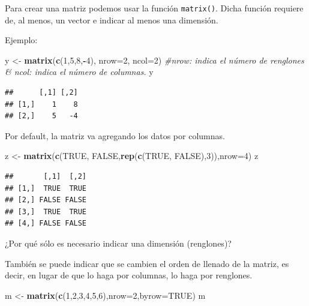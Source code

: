 \documentclass[
]{book}
\newenvironment{Shaded}{\begin{snugshade}}{\end{snugshade}}
\newcommand{\AttributeTok}[1]{\textcolor[rgb]{0.13,0.29,0.53}{#1}}
\newcommand{\CommentTok}[1]{\textcolor[rgb]{0.56,0.35,0.01}{\textit{#1}}}
\newcommand{\ConstantTok}[1]{\textcolor[rgb]{0.56,0.35,0.01}{#1}}
\newcommand{\DecValTok}[1]{\textcolor[rgb]{0.00,0.00,0.81}{#1}}
\newcommand{\FunctionTok}[1]{\textcolor[rgb]{0.13,0.29,0.53}{\textbf{#1}}}
\newcommand{\NormalTok}[1]{#1}
\newcommand{\OtherTok}[1]{\textcolor[rgb]{0.56,0.35,0.01}{#1}}
\newcommand{\SpecialCharTok}[1]{\textcolor[rgb]{0.81,0.36,0.00}{\textbf{#1}}}
\begin{document}
Para crear una matriz podemos usar la función \texttt{matrix()}. Dicha función requiere de, al menos, un vector e indicar al menos una dimensión.

Ejemplo:

\begin{Shaded}
\begin{Highlighting}[]
\NormalTok{y }\OtherTok{\textless{}{-}} \FunctionTok{matrix}\NormalTok{(}\FunctionTok{c}\NormalTok{(}\DecValTok{1}\NormalTok{,}\DecValTok{5}\NormalTok{,}\DecValTok{8}\NormalTok{,}\SpecialCharTok{{-}}\DecValTok{4}\NormalTok{), }\AttributeTok{nrow=}\DecValTok{2}\NormalTok{, }\AttributeTok{ncol=}\DecValTok{2}\NormalTok{) }\CommentTok{\#nrow: indica el número de renglones \& ncol: indica el número de columnas. }
\NormalTok{y}
\end{Highlighting}
\end{Shaded}

\begin{verbatim}
##      [,1] [,2]
## [1,]    1    8
## [2,]    5   -4
\end{verbatim}

Por default, la matriz va agregando los datos por columnas.

\begin{Shaded}
\begin{Highlighting}[]
\NormalTok{z }\OtherTok{\textless{}{-}} \FunctionTok{matrix}\NormalTok{(}\FunctionTok{c}\NormalTok{(}\ConstantTok{TRUE}\NormalTok{, }\ConstantTok{FALSE}\NormalTok{,}\FunctionTok{rep}\NormalTok{(}\FunctionTok{c}\NormalTok{(}\ConstantTok{TRUE}\NormalTok{, }\ConstantTok{FALSE}\NormalTok{),}\DecValTok{3}\NormalTok{)),}\AttributeTok{nrow=}\DecValTok{4}\NormalTok{)}
\NormalTok{z}
\end{Highlighting}
\end{Shaded}

\begin{verbatim}
##       [,1]  [,2]
## [1,]  TRUE  TRUE
## [2,] FALSE FALSE
## [3,]  TRUE  TRUE
## [4,] FALSE FALSE
\end{verbatim}

¿Por qué sólo es necesario indicar una dimensión (renglones)?

También se puede indicar que se cambien el orden de llenado de la matriz, es decir, en lugar de que lo haga por columnas, lo haga por renglones.

\begin{Shaded}
\begin{Highlighting}[]
\NormalTok{m }\OtherTok{\textless{}{-}} \FunctionTok{matrix}\NormalTok{(}\FunctionTok{c}\NormalTok{(}\DecValTok{1}\NormalTok{,}\DecValTok{2}\NormalTok{,}\DecValTok{3}\NormalTok{,}\DecValTok{4}\NormalTok{,}\DecValTok{5}\NormalTok{,}\DecValTok{6}\NormalTok{),}\AttributeTok{nrow=}\DecValTok{2}\NormalTok{,}\AttributeTok{byrow=}\ConstantTok{TRUE}\NormalTok{)}
\NormalTok{m}
\end{Highlighting}
\end{Shaded}
\end{document}
